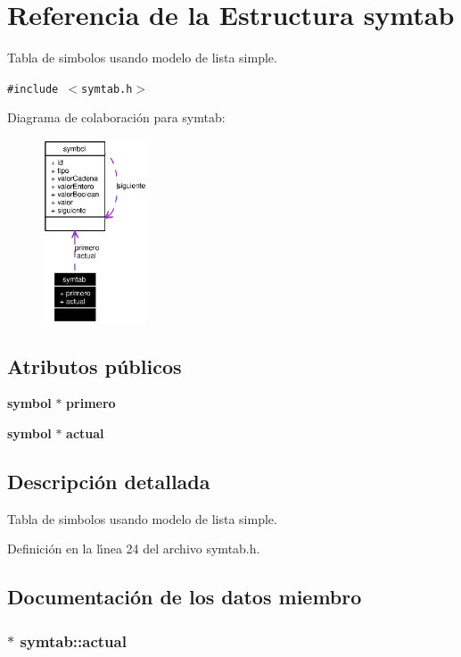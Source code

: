 \section{Referencia de la Estructura symtab}
\label{structsymtab}
Tabla de simbolos usando modelo de lista simple.  


{\tt \#include $<$symtab.h$>$}

Diagrama de colaboraci\'{o}n para symtab:\begin{figure}[H]
\begin{center}
\leavevmode
\includegraphics[width=88pt]{structsymtab__coll__graph}
\end{center}
\end{figure}
\subsection*{Atributos p\'{u}blicos}
\begin{CompactItemize}
\item 
{\bf symbol} $\ast$ {\bf primero}
\item 
{\bf symbol} $\ast$ {\bf actual}
\end{CompactItemize}


\subsection{Descripci\'{o}n detallada}
Tabla de simbolos usando modelo de lista simple. 



Definici\'{o}n en la l\'{\i}nea 24 del archivo symtab.h.

\subsection{Documentaci\'{o}n de los datos miembro}
\subsubsection{$\ast$ {\bf symtab::actual}}\label{structsymtab_o1}





